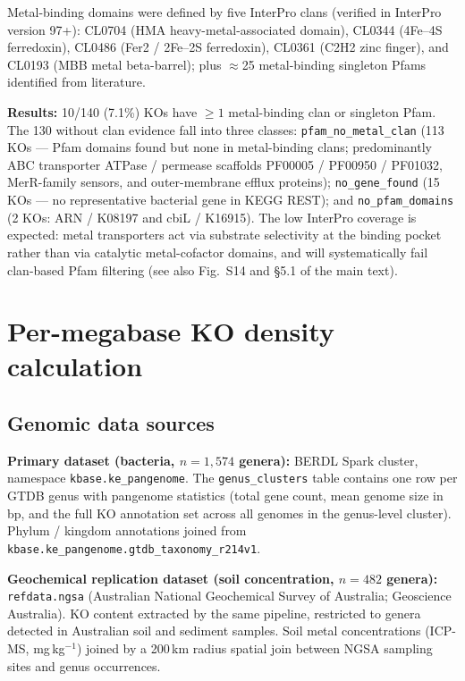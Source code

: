 \documentclass[11pt]{article}
\begin{document}
Metal-binding domains were defined by five InterPro clans (verified in
InterPro version 97+): CL0704 (HMA heavy-metal-associated domain), CL0344
(4Fe--4S ferredoxin), CL0486 (Fer2 / 2Fe--2S ferredoxin), CL0361 (C2H2 zinc
finger), and CL0193 (MBB metal beta-barrel); plus $\approx$25 metal-binding
singleton Pfams identified from literature.

\textbf{Results:} 10/140 (7.1\%) KOs have $\geq 1$ metal-binding clan or
singleton Pfam.  The 130 without clan evidence fall into three classes:
\texttt{pfam\_no\_metal\_clan} (113 KOs — Pfam domains found but none in
metal-binding clans; predominantly ABC transporter ATPase / permease scaffolds
PF00005 / PF00950 / PF01032, MerR-family sensors, and outer-membrane efflux
proteins); \texttt{no\_gene\_found} (15 KOs — no representative bacterial gene
in KEGG REST); and \texttt{no\_pfam\_domains} (2 KOs: ARN / K08197 and cbiL /
K16915).  The low InterPro coverage is expected: metal transporters act via
substrate selectivity at the binding pocket rather than via catalytic
metal-cofactor domains, and will systematically fail clan-based Pfam filtering
(see also Fig.~S14 and §5.1 of the main text).

\section{Per-megabase KO density calculation}
\label{sm:density}

\subsection{Genomic data sources}

\textbf{Primary dataset (bacteria, $n = 1{,}574$ genera):} BERDL Spark cluster,
namespace \texttt{kbase.ke\_pangenome}.  The \texttt{genus\_clusters} table
contains one row per GTDB genus with pangenome statistics (total gene count,
mean genome size in bp, and the full KO annotation set across all genomes in
the genus-level cluster).  Phylum / kingdom annotations joined from
\texttt{kbase.ke\_pangenome.gtdb\_taxonomy\_r214v1}.

\textbf{Geochemical replication dataset (soil concentration,
$n = 482$ genera):} \texttt{refdata.ngsa} (Australian National Geochemical
Survey of Australia; Geoscience Australia).  KO content extracted by the same
pipeline, restricted to genera detected in Australian soil and sediment samples.
Soil metal concentrations (ICP-MS, mg\,kg$^{-1}$) joined by a 200\,km radius
spatial join between NGSA sampling sites and genus occurrences.
\end{document}
